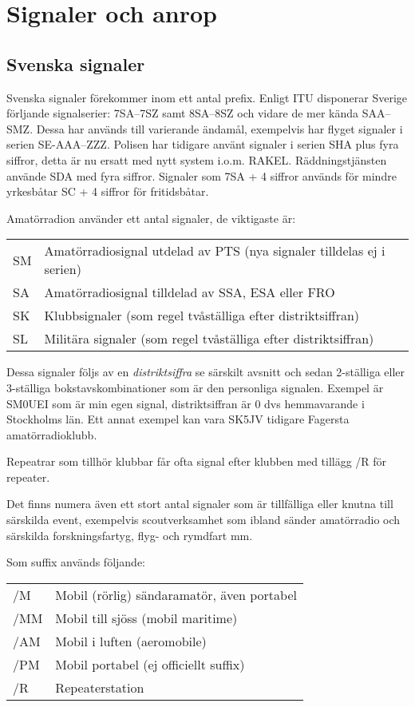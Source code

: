 \section{Signaler och anrop}
\subsection{Svenska signaler}

Svenska signaler förekommer inom ett antal prefix. Enligt ITU disponerar Sverige förljande signalserier:
7SA--7SZ samt 8SA--8SZ och vidare de mer kända SAA--SMZ. Dessa har används till varierande ändamål, exempelvis har flyget signaler i serien SE-AAA--ZZZ. Polisen har tidigare använt signaler i serien SHA plus fyra siffror, detta är nu ersatt med nytt system i.o.m. RAKEL. Räddningstjänsten använde SDA med fyra siffror. Signaler som 7SA + 4 siffror används för mindre yrkesbåtar SC + 4 siffror för fritidsbåtar.

Amatörradion använder ett antal signaler, de viktigaste är:

\begin{tabular}{ll}
	SM & Amatörradiosignal utdelad av PTS (nya signaler tilldelas ej i serien) \\
	SA & Amatörradiosignal tilldelad av SSA, ESA eller FRO                     \\
	SK & Klubbsignaler (som regel tvåställiga efter distriktsiffran)           \\
	SL & Militära signaler (som regel tvåställiga efter distriktsiffran)
\end{tabular}

Dessa signaler följs av en \textit{distriktsiffra} se särskilt avsnitt och sedan 2-ställiga eller 3-ställiga bokstavskombinationer som är den personliga signalen. Exempel är SM0UEI som är min egen signal, distriktsiffran är 0 dvs hemmavarande i Stockholms län. Ett annat exempel kan vara SK5JV tidigare Fagersta amatörradioklubb.

Repeatrar som tillhör klubbar får ofta signal efter klubben med tillägg /R för repeater.

Det finns numera även ett stort antal signaler som är tillfälliga eller knutna till särskilda event, exempelvis scoutverksamhet som ibland sänder amatörradio och särskilda forskningsfartyg, flyg- och rymdfart mm.

Som suffix används följande:

\begin{tabular}{ll}
	/M  & Mobil (rörlig) sändaramatör, även portabel \\
	/MM & Mobil till sjöss (mobil maritime)          \\
	/AM & Mobil i luften (aeromobile)                \\
	/PM & Mobil portabel (ej officiellt suffix)\\
	/R  & Repeaterstation
\end{tabular}

